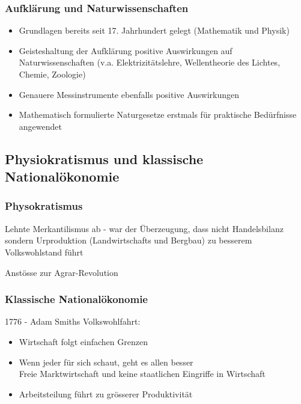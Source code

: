 \documentclass{report}
\begin{document}
\subsubsection{Aufklärung und Naturwissenschaften}
\begin{itemize}
	\item Grundlagen bereits seit 17. Jahrhundert gelegt (Mathematik und Physik)
	\item Geisteshaltung der Aufklärung positive Auswirkungen auf Naturwissenschaften (v.a. Elektrizitätslehre, Wellentheorie des Lichtes, Chemie, Zoologie)
	\item Genauere Messinstrumente  ebenfalls positive Auswirkungen
	\item Mathematisch formulierte Naturgesetze erstmals für praktische Bedürfnisse angewendet
\end{itemize}

\newpage
\subsection{Physiokratismus und klassische Nationalökonomie}
\subsubsection{Physokratismus}
Lehnte Merkantilismus ab - war der Überzeugung, dass nicht Handelsbilanz sondern Urproduktion (Landwirtschafts und Bergbau) zu besserem Volkswohlstand führt

\arrow Anstösse zur Agrar-Revolution

\subsubsection{Klassische Nationalökonomie}
1776 - Adam Smiths Volkswohlfahrt:
\begin{itemize}
	\item Wirtschaft folgt einfachen Grenzen
	\item Wenn jeder für sich schaut, geht es allen besser\\
		\arrow Freie Marktwirtschaft und keine staatlichen Eingriffe in Wirtschaft
	\item Arbeitsteilung führt zu grösserer Produktivität
\end{itemize}
\end{document}
